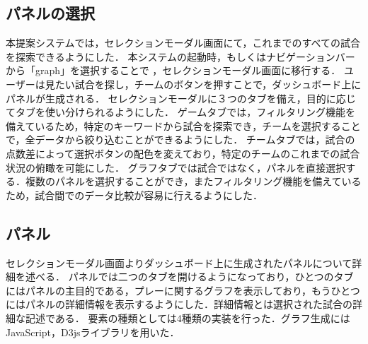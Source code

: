 \documentclass[sotsuron]{kuee}
\begin{document}
		\subsection{パネルの選択}
			本提案システムでは，セレクションモーダル画面にて，これまでのすべての試合を探索できるようにした．
			本システムの起動時，もしくはナビゲーションバーから「graph」を選択することで	，セレクションモーダル画面に移行する．
			ユーザーは見たい試合を探し，チームのボタンを押すことで，ダッシュボード上にパネルが生成される．
			セレクションモーダルに３つのタブを備え，目的に応じてタブを使い分けられるようにした．
			ゲームタブでは，フィルタリング機能を備えているため，特定のキーワードから試合を探索でき，チームを選択することで，全データから絞り込むことができるようにした．
			チームタブでは，試合の点数差によって選択ボタンの配色を変えており，特定のチームのこれまでの試合状況の俯瞰を可能にした．
			グラフタブでは試合ではなく，パネルを直接選択する．複数のパネルを選択することができ，またフィルタリング機能を備えているため，試合間でのデータ比較が容易に行えるようにした．
		\subsection{パネル}
			セレクションモーダル画面よりダッシュボード上に生成されたパネルについて詳細を述べる．
			パネルでは二つのタブを開けるようになっており，ひとつのタブにはパネルの主目的である，プレーに関するグラフを表示しており，もうひとつにはパネルの詳細情報を表示するようにした．詳細情報とは選択された試合の詳細な記述である．
			要素の種類としては4種類の実装を行った．グラフ生成にはJavaScript，D3jsライブラリを用いた．
\end{document}
